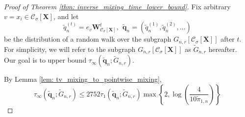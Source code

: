 \documentclass{article}
\newcommand{\1}{\mathbf{1}}
\newcommand{\qbf}{\mathbf{q}}
\newcommand{\Xbf}{\mathbf{X}}
\newcommand{\Wbf}{\mathbf{W}}
\newcommand{\Cset}{\mathcal{C}}
\newcommand{\Csig}{\Cset_{\sigma}}
\theoremstyle{aldenthm}
\begin{document}
\begin{proof}[Proof of Theorem \ref{thm: inverse_mixing_time_lower_bound}]
	Fix arbitrary $v = x_i \in \Csig[\Xbf]$, and let
	\begin{equation*}
	\widetilde{q}_n^{(t)} = e_v \Wbf_{\Csig[\Xbf]}^t, ~~ \widetilde{\qbf}_n = (\widetilde{q}_n^{(1)}, \widetilde{q}_n^{(2)}, \ldots)
	\end{equation*}
	be the distribution of a random walk over the subgraph $G_{n,r}[\Csig[\Xbf]]$ after $t$. For simplicity, we will refer to the subgraph $G_{n,r}[\Csig[\Xbf]]$ as $\widetilde{G}_{n,r}$ hereafter. Our goal is to upper bound $\tau_{\infty}(\widetilde{\qbf}_n; \widetilde{G}_{n,r})$.
	
	By Lemma \ref{lem: tv_mixing_to_pointwise_mixing}, 
	\begin{equation*}
	\tau_{\infty}(\widetilde{\qbf}_n; \widetilde{G}_{n,r}) \leq 2752 \tau_{1}(\widetilde{\qbf}_n; \widetilde{G}_{n,r}) \max\left\{2, \log\left(\frac{4}{10 \widetilde{\pi}_{1,n}}\right) \right\}
	\end{equation*} 
	

\end{proof}
\end{document}
